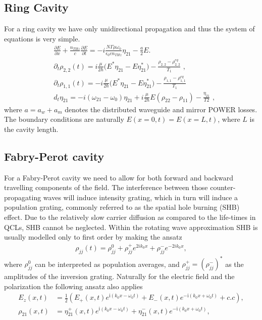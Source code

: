 \documentclass[preprint,secnumarabic,amssymb, nobibnotes, aip, prd]{revtex4-1}
\def\p{\partial}
\begin{document}
\subsection{Ring Cavity}
For a ring cavity we have only unidirectional propagation and thus the system of equations is very simple.  
\begin{align}
& \frac{\p E}{\p x}+ \frac{n_{THz}}{c} \frac{\p E}{\p t} = -i\frac{N\Gamma\mu\omega_0}{\epsilon_0 c n_{THz}}\eta_{21}-\frac{a}{2}E.
\\
& \partial_t {\rho_{2,2}(t)} = i\frac{ \mu }{2 \hbar} \Big ( E^* \eta_{21} - E\eta_{21}^* \Big) -\frac{\rho_{2,2}-\rho_{2,2}^{eq}}{T_1}\text{  ,} \label{eq:inversion1}
\\
& \partial_t {\rho_{1,1}(t)} = - i\frac{ \mu }{2 \hbar} \Big ( E^* \eta_{21} - E\eta_{21}^* \Big) -\frac{\rho_{1,1}-\rho_{1,1}^{eq}}{T_1} \label{eq:inversion2}
\\
& d_t \eta_{21} = -i(\omega_{21}-\omega_0)\eta_{21}+i\frac{ \mu}{ 2 \hbar} E(\rho_{22}-\rho_{11}) - \frac{\eta_{21}}{T2} \text{  ,}
\end{align}
where $a = a_w+a_m$ denotes the distributed waveguide and mirror POWER losses. The boundary conditions are naturally $E(x=0,t)=E(x=L,t)$, where $L$ is the cavity length.

\subsection{Fabry-Perot cavity}

For a Fabry-Perot cavity we need to allow for both forward and backward travelling components of the field. The interference between those counter-propagating waves will induce intensity grating, which in turn will induce a population grating, commonly referred to as the spatial hole burning (SHB) effect. Due to the relatively slow carrier diffusion as compared to the life-times in QCLs, SHB cannot be neglected. Within the rotating wave approximation SHB is usually modelled only to first order by making the ansatz 
\begin{align}
\rho_{jj}(t) = \rho_{jj}^{0} + \rho_{jj}^{+}e^{2ik_0x}+\rho_{jj}^{-}e^{-2ik_0x}, 
\end{align}
where $\rho_{jj}^{0}$ can be interpreted as population averages, and $\rho_{jj}^{+}=(\rho_{jj}^{-})^{\ast}$ as the amplitudes of the inversion grating. Naturally for the electric field and the polarization the following ansatz also applies 
\begin{align}
E_{z}(x,t) &=\frac{1}{2}\left( E_{+}(x,t)e^{\mathrm{i}(k_{0}x-\omega_{0}t)} +E_{-}(x,t)e^{-\mathrm{i}(k_{0}x+\omega_{0}t)}  +c.c\right)  , \label{eq:FPansatz-field} \\
\rho_{21}(x,t)  &  =\eta_{21}^{+}(x,t)e^{  \mathrm{i}(k_{0}x-\omega_{0}t)}  +\eta_{21}^{-}(x,t)e^{-\mathrm{i}(k_{0}x+\omega_{0}t)}  ,\label{eq:21ansatz}
\end{align}
\end{document}
